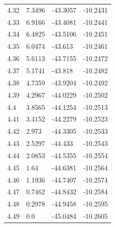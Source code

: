 \begin{tabular}{llll}
4.32 & 7.3496 & -43.3057 & -10.2431 \\
4.33 & 6.9166 & -43.4081 & -10.2441 \\
4.34 & 6.4825 & -43.5106 & -10.2451 \\
4.35 & 6.0474 & -43.613 & -10.2461 \\
4.36 & 5.6113 & -43.7155 & -10.2472 \\
4.37 & 5.1741 & -43.818 & -10.2482 \\
4.38 & 4.7359 & -43.9204 & -10.2492 \\
4.39 & 4.2967 & -44.0229 & -10.2502 \\
4.4 & 3.8565 & -44.1254 & -10.2513 \\
4.41 & 3.4152 & -44.2279 & -10.2523 \\
4.42 & 2.973 & -44.3305 & -10.2533 \\
4.43 & 2.5297 & -44.433 & -10.2543 \\
4.44 & 2.0853 & -44.5355 & -10.2554 \\
4.45 & 1.64 & -44.6381 & -10.2564 \\
4.46 & 1.1936 & -44.7407 & -10.2574 \\
4.47 & 0.7462 & -44.8432 & -10.2584 \\
4.48 & 0.2978 & -44.9458 & -10.2595 \\
4.49 & 0.0 & -45.0484 & -10.2605 \\
\bottomrule
\end{tabular}
